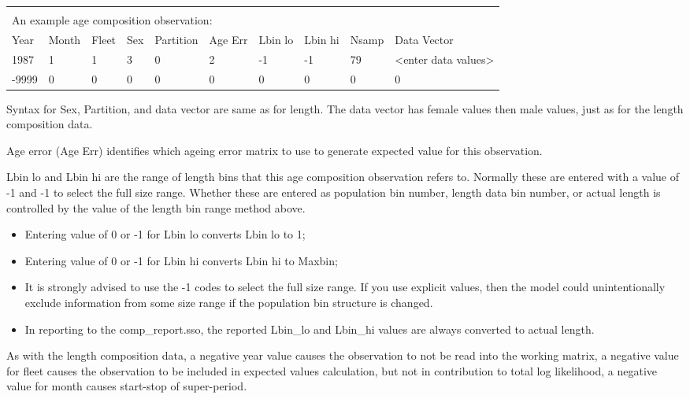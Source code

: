 \begin{tabular}{p{1cm} p{1cm} p{1cm} p{1cm} p{1.5cm} p{1cm} p{1cm} p{1cm} p{1cm} p{2.1cm}}
	\multicolumn{10}{l}{ }\\
	\multicolumn{10}{l}{An example age composition observation:}\\
	\hline
	Year & Month & Fleet & Sex & Partition & Age Err & Lbin lo & Lbin hi & Nsamp & Data Vector \Tstrut\\
	\hline
	1987 & 1 & 1 & 3 & 0 & 2 & -1 & -1 & 79 & <enter data values>\Tstrut\\
	-9999 & 0 & 0 & 0 & 0 & 0 & 0 & 0 & 0 & 0\Bstrut\\
	\hline
\end{tabular}

Syntax for Sex, Partition, and data vector are same as for length. The data vector has female values then male values, just as for the length composition data.

\pagebreak

Age error (Age Err) identifies which ageing error matrix to use to generate expected value for this observation.

Lbin lo and Lbin hi are the range of length bins that this age composition observation refers to.  Normally these are entered with a value of -1 and -1 to select the full size range.  Whether these are entered as population bin number, length data bin number, or actual length is controlled by the value of the length bin range method above.

\begin{itemize}
	\item Entering value of 0 or -1 for Lbin lo converts Lbin lo to 1;
	\item Entering value of 0 or -1 for Lbin hi converts Lbin hi to Maxbin;
	\item It is strongly advised to use the -1 codes to select the full size range.  If you use explicit values, then the model could unintentionally exclude information from some size range if the population bin structure is changed.
	\item In reporting to the comp\_report.sso, the reported Lbin\_lo and Lbin\_hi values are always converted to actual length.
\end{itemize}

As with the length composition data, a negative year value causes the observation to not be read into the working matrix, a negative value for fleet causes the observation to be included in expected values calculation, but not in contribution to total log likelihood, a negative value for month causes start-stop of super-period.


